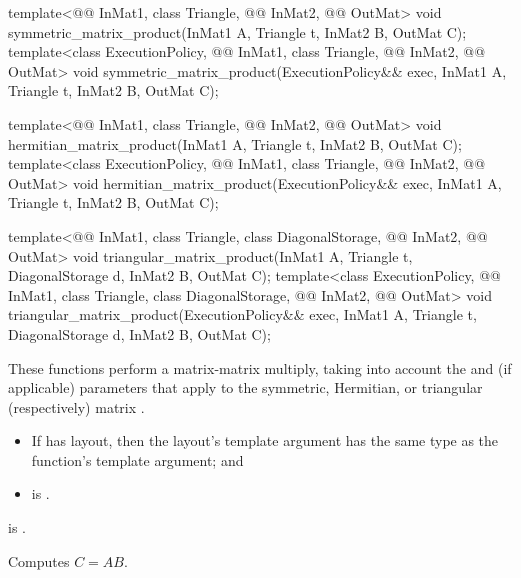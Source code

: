 %
\begin{itemdecl}
template<@@ InMat1, class Triangle, @@ InMat2, @@ OutMat>
  void symmetric_matrix_product(InMat1 A, Triangle t, InMat2 B, OutMat C);
template<class ExecutionPolicy,
         @@ InMat1, class Triangle, @@ InMat2, @@ OutMat>
  void symmetric_matrix_product(ExecutionPolicy&& exec, InMat1 A, Triangle t, InMat2 B, OutMat C);

template<@@ InMat1, class Triangle, @@ InMat2, @@ OutMat>
  void hermitian_matrix_product(InMat1 A, Triangle t, InMat2 B, OutMat C);
template<class ExecutionPolicy,
         @@ InMat1, class Triangle, @@ InMat2, @@ OutMat>
  void hermitian_matrix_product(ExecutionPolicy&& exec, InMat1 A, Triangle t, InMat2 B, OutMat C);

template<@@ InMat1, class Triangle, class DiagonalStorage,
         @@ InMat2, @@ OutMat>
  void triangular_matrix_product(InMat1 A, Triangle t, DiagonalStorage d, InMat2 B, OutMat C);
template<class ExecutionPolicy, @@ InMat1, class Triangle, class DiagonalStorage,
         @@ InMat2, @@ OutMat>
  void triangular_matrix_product(ExecutionPolicy&& exec,
                                 InMat1 A, Triangle t, DiagonalStorage d, InMat2 B, OutMat C);
\end{itemdecl}

\begin{itemdescr}
\pnum
These functions perform a matrix-matrix multiply,
taking into account
the  and  (if applicable) parameters
that apply to the symmetric, Hermitian, or triangular (respectively) matrix .

\pnum
\mandates
\begin{itemize}
\item
If  has  layout,
then the layout's  template argument has
the same type as the function's  template argument; and
\item
{} is .
\end{itemize}

\pnum
\expects
{} is .

\pnum
\effects
Computes $C = A B$.
\end{itemdescr}

